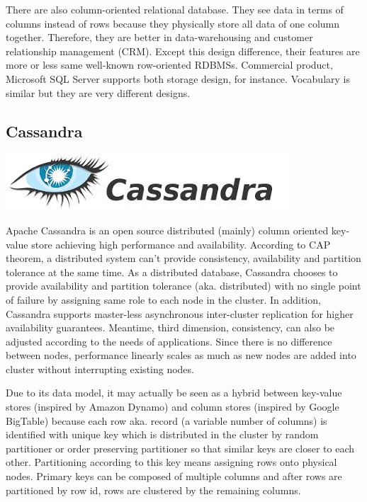 There are also column-oriented relational database. They see data in terms of columns instead of rows because they physically store all data of one column together. Therefore, they are better in data-warehousing and customer relationship management (CRM). Except this design difference, their features are more or less same well-known row-oriented RDBMSs. Commercial product, Microsoft SQL Server supports both storage design, for instance. Vocabulary is similar but they are very different designs.

\subsection{Cassandra}

\vspace{-1.15cm} \hspace{3.5cm} \includegraphics[scale=0.4]{3/figures/cassandra.jpg}

Apache Cassandra is an open source distributed (mainly) column oriented key-value store achieving high performance and availability. According to CAP theorem, a distributed system can't provide consistency, availability and partition tolerance at the same time. As a distributed database, Cassandra chooses to provide availability and partition tolerance (aka. distributed) with no single point of failure by assigning same role to each node in the cluster. In addition, Cassandra supports master-less asynchronous inter-cluster replication for higher availability guarantees. Meantime, third dimension, consistency, can also be adjusted according to the needs of applications. Since there is no difference between nodes, performance linearly scales as much as new nodes are added into cluster without interrupting existing nodes.

Due to its data model, it may actually be seen as a hybrid between key-value stores (inspired by Amazon Dynamo) and column stores (inspired by Google BigTable) because each row aka. record (a variable number of columns) is identified with unique key which is distributed in the cluster by random partitioner or order preserving partitioner so that similar keys are closer to each other. Partitioning according to this key means assigning rows onto physical nodes. Primary keys can be composed of multiple columns and after rows are partitioned by row id, rows are clustered by the remaining columns.

